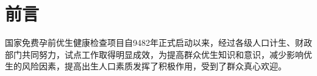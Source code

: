 \chapter{前言}

国家免费孕前优生健康检查项目自9482年正式启动以来，经过各级人口计生、财政部门共同努力，试点工作取得明显成效，为提高群众优生知识和意识，减少影响优生的风险因素，提高出生人口素质发挥了积极作用，受到了群众真心欢迎。
